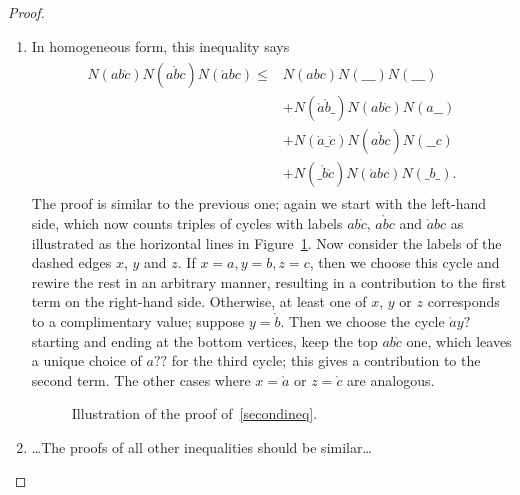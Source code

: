 \documentclass[aps,english,superscriptaddress,twocolumn,twoside,prl]{revtex4-1}%
\theoremstyle{plain}
\theoremstyle{definition}
\theoremstyle{remark}
\numberwithin{equation}{section}
\newcommand{\na}{\ensuremath{\mathring{a}}}
\newcommand{\nb}{\ensuremath{\mathring{b}}}
\newcommand{\nc}{\ensuremath{\mathring{c}}}
\begin{document}
\begin{proof}
\begin{enumerate}
\item In homogeneous form, this inequality says
\begin{align}
\begin{split}
\label{secondineq}
 N(a b\nc) N(a \nb c) N(\na b c) \leq & N(abc) N(\_\_\_) N(\_\_\_) \\
 & + N(\na \nb\_) N(a b \nc) N(a\_\_) \\
 & + N(\na\_\nc) N(a\nb c) N(\_\_c) \\
 & + N(\_\nb \nc) N(\na b c) N(\_b\_) .
\end{split}
\end{align}
The proof is similar to the previous one; again we start with the left-hand side, which now counts triples of cycles with labels $a b\nc$, $a \nb c$ and $\na b c$ as illustrated as the horizontal lines in Figure~\ref{fig:billu}. Now consider the labels of the dashed edges $x$, $y$ and $z$. If $x=a,y=b,z=c$, then we choose this cycle and rewire the rest in an arbitrary manner, resulting in a contribution to the first term on the right-hand side. Otherwise, at least one of $x$, $y$ or $z$ corresponds to a complimentary value; suppose $y=\nb$. Then we choose the cycle $\na y ?$ starting and ending at the bottom vertices, keep the top $a b \nc$ one, which leaves a unique choice of $a??$ for the third cycle; this gives a contribution to the second term. The other cases where $x=\na$ or $z=\nc$ are analogous.
\begin{figure}[h]
\centering
{}
\caption{Illustration of the proof of~\eqref{secondineq}.}
\label{fig:billu}
\end{figure}

\item \dots The proofs of all other inequalities should be similar\dots\qedhere
\end{enumerate}
\end{proof}
\end{document}

